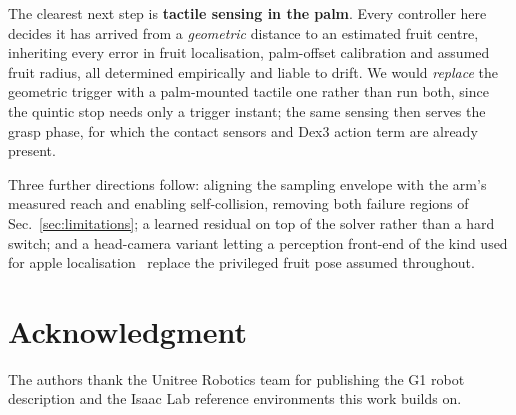 \documentclass[conference]{IEEEtran}
\begin{document}
The clearest next step is \textbf{tactile sensing in the palm}. Every
controller here decides it has arrived from a \emph{geometric} distance to an
estimated fruit centre, inheriting every error in fruit localisation,
palm-offset calibration and assumed fruit radius, all determined empirically
and liable to drift. We would \emph{replace} the geometric trigger with a
palm-mounted tactile one rather than run both, since the quintic stop needs
only a trigger instant; the same sensing then serves the grasp phase, for
which the contact sensors and Dex3 action term are already present.

Three further directions follow: aligning the sampling envelope with the
arm's measured reach and enabling self-collision, removing both failure
regions of Sec.~\ref{sec:limitations}; a learned residual on top of the
solver rather than a hard switch; and a head-camera variant letting a
perception front-end of the kind used for apple
localisation~\cite{selvaraj2024segmentation} replace the privileged fruit pose
assumed throughout.

\section*{Acknowledgment}

The authors thank the Unitree Robotics team for publishing the G1 robot
description and the Isaac Lab reference environments this work builds on.



\end{document}
